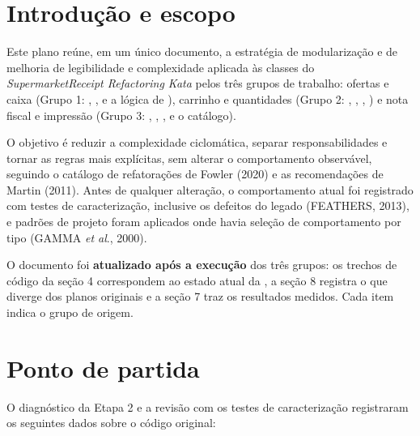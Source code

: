 

\tableofcontents\newpage

\section{Introdução e escopo}

Este plano reúne, em um único documento, a estratégia de modularização e de melhoria de legibilidade e complexidade aplicada às classes do \textit{SupermarketReceipt Refactoring Kata} pelos três grupos de trabalho: ofertas e caixa (Grupo 1: , ,  e a lógica de ), carrinho e quantidades (Grupo 2: , , , ) e nota fiscal e impressão (Grupo 3: , , ,  e o catálogo).

O objetivo é reduzir a complexidade ciclomática, separar responsabilidades e tornar as regras mais explícitas, sem alterar o comportamento observável, seguindo o catálogo de refatorações de Fowler (2020) e as recomendações de Martin (2011). Antes de qualquer alteração, o comportamento atual foi registrado com testes de caracterização, inclusive os defeitos do legado (FEATHERS, 2013), e padrões de projeto foram aplicados onde havia seleção de comportamento por tipo (GAMMA \textit{et al}., 2000).

O documento foi \textbf{atualizado após a execução} dos três grupos: os trechos de código da seção 4 correspondem ao estado atual da , a seção 8 registra o que diverge dos planos originais e a seção 7 traz os resultados medidos. Cada item indica o grupo de origem.

\section{Ponto de partida}

O diagnóstico da Etapa 2 e a revisão com os testes de caracterização registraram os seguintes dados sobre o código original:


